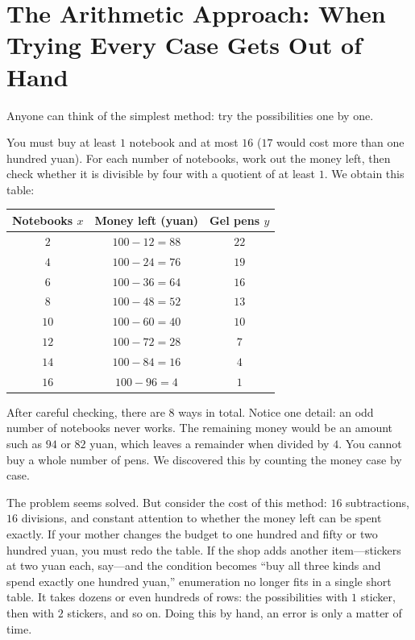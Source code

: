 \section{The Arithmetic Approach: When Trying Every Case Gets Out of Hand}

Anyone can think of the simplest method: try the possibilities one by one.

You must buy at least $1$ notebook and at most $16$ ($17$ would cost more than one hundred yuan). For each number of notebooks, work out the money left, then check whether it is divisible by four with a quotient of at least $1$. We obtain this table:

\begin{center}
\begin{tabular}{ccc}
\toprule
Notebooks $x$ & Money left (yuan) & Gel pens $y$ \\
\midrule
$2$ & $100-12=88$ & $22$ \\
$4$ & $100-24=76$ & $19$ \\
$6$ & $100-36=64$ & $16$ \\
$8$ & $100-48=52$ & $13$ \\
$10$ & $100-60=40$ & $10$ \\
$12$ & $100-72=28$ & $7$ \\
$14$ & $100-84=16$ & $4$ \\
$16$ & $100-96=4$ & $1$ \\
\bottomrule
\end{tabular}
\end{center}

After careful checking, there are $8$ ways in total. Notice one detail: an odd number of notebooks never works. The remaining money would be an amount such as $94$ or $82$ yuan, which leaves a remainder when divided by $4$. You cannot buy a whole number of pens. We discovered this by counting the money case by case.

The problem seems solved. But consider the cost of this method: $16$ subtractions, $16$ divisions, and constant attention to whether the money left can be spent exactly. If your mother changes the budget to one hundred and fifty or two hundred yuan, you must redo the table. If the shop adds another item---stickers at two yuan each, say---and the condition becomes ``buy all three kinds and spend exactly one hundred yuan,'' enumeration no longer fits in a single short table. It takes dozens or even hundreds of rows: the possibilities with $1$ sticker, then with $2$ stickers, and so on. Doing this by hand, an error is only a matter of time.

